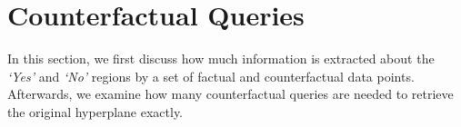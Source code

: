 \documentclass{article}
\begin{document}

\section{Counterfactual Queries}\label{sec:CF}
In this section, we first discuss how much information is extracted about the \textit{‘Yes’} and \textit{‘No’} regions by a set of factual and counterfactual data points. Afterwards, we examine how many counterfactual queries are needed to retrieve the original hyperplane exactly.
\end{document}
